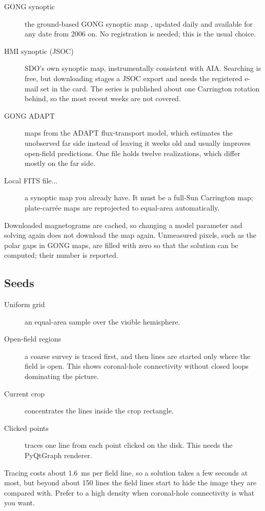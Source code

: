 \begin{description}
  \item[GONG synoptic] the ground-based GONG synoptic map \parencite{harvey1996}, updated daily
    and available for any date from 2006 on. No registration is needed; this is the usual
    choice.
  \item[HMI synoptic (JSOC)] SDO's own synoptic map, instrumentally consistent with AIA.
    Searching is free, but downloading stages a JSOC export and needs the registered e-mail
    set in the  card. The series is published about one Carrington rotation
    behind, so the most recent weeks are not covered.
  \item[GONG ADAPT] maps from the ADAPT flux-transport model, which estimates the unobserved
    far side instead of leaving it weeks old and usually improves open-field predictions. One
    file holds twelve realizations, which differ mostly on the far side.
  \item[Local FITS file...] a synoptic map you already have. It must be a full-Sun Carrington
    map; plate-carrée maps are reprojected to equal-area automatically.
\end{description}
Downloaded magnetograms are cached, so changing a model parameter and solving again does not
download the map again. Unmeasured pixels, such as the polar gaps in GONG maps, are filled
with zero so that the solution can be computed; their number is reported.

\subsection{Seeds}
\label{sec:pfss-seeds}

\begin{description}
  \item[Uniform grid] an equal-area sample over the visible hemisphere.
  \item[Open-field regions] a coarse survey is traced first, and then lines are started only
    where the field is open. This shows coronal-hole connectivity without closed loops
    dominating the picture.
  \item[Current crop] concentrates the lines inside the crop rectangle.
  \item[Clicked points] traces one line from each point clicked on the disk. This needs the
    PyQtGraph renderer.
\end{description}
Tracing costs about 1.6~ms per field line, so a solution takes a few seconds at most, but
beyond about 150 lines the field lines start to hide the image they are compared with. Prefer
 to a high density when coronal-hole connectivity is what you want.

